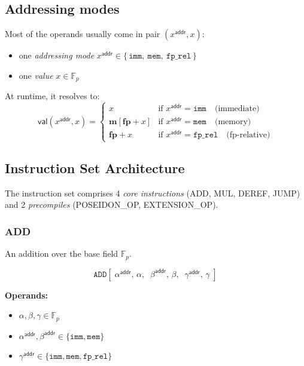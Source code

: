 \documentclass{article}
\theoremstyle{definition}
\newcommand{\Fp}{\mathbb F_p}
\begin{document}
\subsection{Addressing modes}

Most of the operands usually come in pair $(x^\textsf{addr}, x)$:
\begin{itemize}
    \item one \textit{addressing mode} $x^\textsf{addr} \in \{\,\texttt{imm},\ \texttt{mem},\ \texttt{fp\_rel}\,\}$
    \item one \textit{value} $x \in \Fp$
\end{itemize}

At runtime, it resolves to:
\[
\mathsf{val}(x^\textsf{addr}, x) =
\begin{cases}
x & \text{if } x^\textsf{addr} = \texttt{imm} \quad \text{(immediate)} \\
\textbf{m}[\textbf{fp} + x] & \text{if } x^\textsf{addr} = \texttt{mem} \quad \text{(memory)} \\
\textbf{fp} + x & \text{if } x^\textsf{addr} = \texttt{fp\_rel} \quad \text{(fp-relative)}
\end{cases}
\]
\subsection{Instruction Set Architecture}\label{sec:isa}

The instruction set comprises 4 \emph{core instructions} (ADD, MUL, DEREF, JUMP) and 2 \emph{precompiles} (POSEIDON\_OP, EXTENSION\_OP).




\subsubsection{ADD}

An addition over the base field $\Fp$.

\[
\texttt{ADD}[\;\alpha^\textsf{addr},\, \alpha,\;\; \beta^\textsf{addr},\, \beta,\;\; \gamma^\textsf{addr},\, \gamma\;]
\]

\textbf{Operands:}
\begin{itemize}
    \item $\alpha, \beta, \gamma \in \Fp$
    \item $\alpha^\textsf{addr}, \beta^\textsf{addr} \in \{\texttt{imm}, \texttt{mem}\}$
    \item $\gamma^\textsf{addr} \in \{\texttt{imm}, \texttt{mem}, \texttt{fp\_rel}\}$
\end{itemize}
\end{document}
